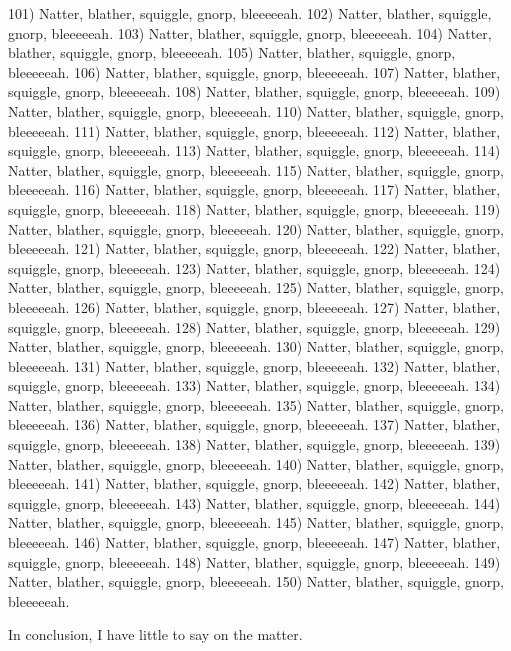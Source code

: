 \documentclass[10pt,letterpaper,busletter,dateno,addrfromright,addrfromleft,orderfromtodate,%
faxheaderpage]{newlfm}
\begin{document}
\begin{newlfm}
101) Natter, blather, squiggle, gnorp, bleeeeeah.
102) Natter, blather, squiggle, gnorp, bleeeeeah.
103) Natter, blather, squiggle, gnorp, bleeeeeah.
104) Natter, blather, squiggle, gnorp, bleeeeeah.
105) Natter, blather, squiggle, gnorp, bleeeeeah.
106) Natter, blather, squiggle, gnorp, bleeeeeah.
107) Natter, blather, squiggle, gnorp, bleeeeeah.
108) Natter, blather, squiggle, gnorp, bleeeeeah.
109) Natter, blather, squiggle, gnorp, bleeeeeah.
110) Natter, blather, squiggle, gnorp, bleeeeeah.
111) Natter, blather, squiggle, gnorp, bleeeeeah.
112) Natter, blather, squiggle, gnorp, bleeeeeah.
113) Natter, blather, squiggle, gnorp, bleeeeeah.
114) Natter, blather, squiggle, gnorp, bleeeeeah.
115) Natter, blather, squiggle, gnorp, bleeeeeah.
116) Natter, blather, squiggle, gnorp, bleeeeeah.
117) Natter, blather, squiggle, gnorp, bleeeeeah.
118) Natter, blather, squiggle, gnorp, bleeeeeah.
119) Natter, blather, squiggle, gnorp, bleeeeeah.
120) Natter, blather, squiggle, gnorp, bleeeeeah.
121) Natter, blather, squiggle, gnorp, bleeeeeah.
122) Natter, blather, squiggle, gnorp, bleeeeeah.
123) Natter, blather, squiggle, gnorp, bleeeeeah.
124) Natter, blather, squiggle, gnorp, bleeeeeah.
125) Natter, blather, squiggle, gnorp, bleeeeeah.
126) Natter, blather, squiggle, gnorp, bleeeeeah.
127) Natter, blather, squiggle, gnorp, bleeeeeah.
128) Natter, blather, squiggle, gnorp, bleeeeeah.
129) Natter, blather, squiggle, gnorp, bleeeeeah.
130) Natter, blather, squiggle, gnorp, bleeeeeah.
131) Natter, blather, squiggle, gnorp, bleeeeeah.
132) Natter, blather, squiggle, gnorp, bleeeeeah.
133) Natter, blather, squiggle, gnorp, bleeeeeah.
134) Natter, blather, squiggle, gnorp, bleeeeeah.
135) Natter, blather, squiggle, gnorp, bleeeeeah.
136) Natter, blather, squiggle, gnorp, bleeeeeah.
137) Natter, blather, squiggle, gnorp, bleeeeeah.
138) Natter, blather, squiggle, gnorp, bleeeeeah.
139) Natter, blather, squiggle, gnorp, bleeeeeah.
140) Natter, blather, squiggle, gnorp, bleeeeeah.
141) Natter, blather, squiggle, gnorp, bleeeeeah.
142) Natter, blather, squiggle, gnorp, bleeeeeah.
143) Natter, blather, squiggle, gnorp, bleeeeeah.
144) Natter, blather, squiggle, gnorp, bleeeeeah.
145) Natter, blather, squiggle, gnorp, bleeeeeah.
146) Natter, blather, squiggle, gnorp, bleeeeeah.
147) Natter, blather, squiggle, gnorp, bleeeeeah.
148) Natter, blather, squiggle, gnorp, bleeeeeah.
149) Natter, blather, squiggle, gnorp, bleeeeeah.
150) Natter, blather, squiggle, gnorp, bleeeeeah.

In conclusion, I have little to say on the matter.
\end{newlfm}
\end{document}
